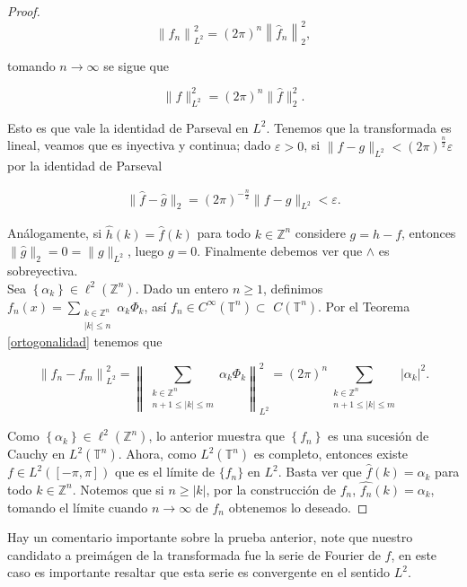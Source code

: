 \documentclass[12pt]{article}
\newcommand\Z{\ensuremath{\mathbb{Z}}}
\newcommand\T{\mathbb{T}}
\renewcommand{\epsilon}{\varepsilon}
\renewcommand{\hat}{\widehat}
\begin{document}
\begin{proof}
$$\left\|f_n\right\|_{L^2}^2=(2 \pi)^n\left\|\widehat{f}_n\right\|_2^2,$$

tomando $n\to \infty$ se sigue que

$$\|f\|_{L^2}^2=(2\pi)^n\|\widehat{f}\|_2^2.$$

Esto es que vale la identidad de Parseval en $L^2$. Tenemos que la transformada es lineal, veamos que es inyectiva y continua; dado $\epsilon>0$, si $\|f-g\|_{L^2}<(2\pi)^{\frac{n}{2}}\epsilon$  por la identidad de Parseval

\begin{align*}
    \|\widehat{f}-\widehat{g}\|_2=(2\pi)^{-\frac{n}{2}}\|f-g\|_{L^2}<\epsilon
.\end{align*}

Análogamente, si $\hat{h}(k)=\hat{f}(k)$ para todo $k\in \Z^n$ considere $g=h-f$, entonces $\|\widehat{g}\|_{2}=0=\|g\|_{L^2}$, luego $g=0$. Finalmente debemos ver que $\wedge$ es sobreyectiva.\\

Sea $\left\{\alpha_k\right\} \in \ell^2(\mathbb{Z}^n)$. Dado un entero $n \geq 1$, definimos $f_n(x)=\displaystyle\sum_{\substack{k\in \Z^n\\
|k|\leq n}} \alpha_k \Phi_k$, así $f_n \in C^{\infty}(\T^n) \subset$ $C(\T^n)$. 
Por el Teorema \ref{ortogonalidad} tenemos que

$$
\left\|f_n-f_m\right\|_{L^2}^2=\left\|\sum_{\substack{k\in \Z^n\\
n+1 \leq|k| \leq m}} \alpha_k \Phi_k\right\|_{L^2}^2=(2 \pi)^n\sum_{\substack{k\in \Z^n\\ n+1 \leq|k| \leq m}}\left|\alpha_k\right|^2.
$$


Como $\left\{\alpha_k\right\} \in \ell^2(\mathbb{Z}^n)$, lo anterior muestra que $\left\{f_n\right\}$ es una sucesión de Cauchy en $L^2(\T^n)$. Ahora, como $L^2(\T^n)$ es completo, entonces existe $f \in L^2([-\pi, \pi])$ que es el límite de $\{f_n\}$ en $L^2$. Basta ver que $\widehat{f}(k)=\alpha_k$ para todo $k \in \mathbb{Z}^n$. Notemos que si $n \geq|k|$, por la construcción de $f_n$, $\widehat{f_n}(k)=\alpha_k$, tomando el límite cuando $n\to \infty$ de $f_n$ obtenemos lo deseado.
\end{proof}

\begin{note}
Hay un comentario importante sobre la prueba anterior, note que nuestro candidato a preimágen de la transformada fue la serie de Fourier de $f$, en este caso es importante resaltar que esta serie es convergente  en el sentido $L^2$.
\end{note}
\end{document}

